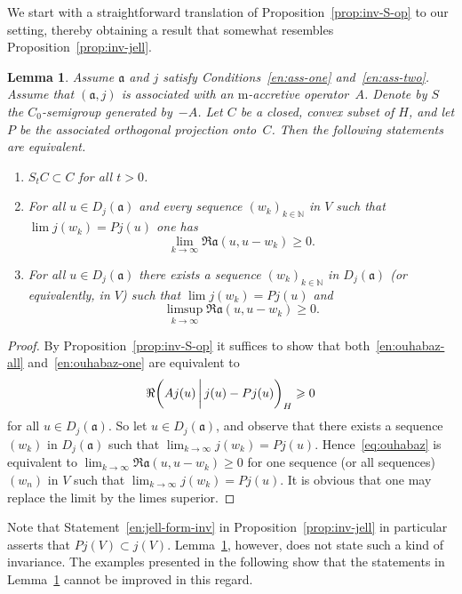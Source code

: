 \documentclass[a4paper,oneside,12pt]{amsart}
\theoremstyle{plain}
\newtheorem{lemma}[theorem]{Lemma}
\theoremstyle{definition}
\let\ge=\geqslant
\begin{document}
We start with a straightforward translation of Proposition~\ref{prop:inv-S-op} to our setting,
thereby obtaining a result that somewhat resembles Proposition~\ref{prop:inv-jell}.
\begin{lemma}\label{lem:acc-bad-ouhabaz}
Assume ${{\mathfrak{{a}}}}$ and $j$ satisfy Conditions~\ref{en:ass-one} and~\ref{en:ass-two}. Assume that
$({{\mathfrak{{a}}}},j)$ is associated with an {\ensuremath{\text{m}}}-accretive operator~$A$.
Denote by $S$ the $C_0$-semigroup generated by~$-A$. Let $C$ be a closed, convex subset of $H$,
and let $P$ be the associated orthogonal projection onto~$C$. Then the following statements are equivalent.

\begin{enumerate}[\upshape (i)]
\item $S_tC\subset C$ for all $t>0$.
\item\label{en:ouhabaz-all} For all $u\in D_j({{\mathfrak{{a}}}})$ and every sequence $(w_k)_{k\in{\mathbb{N}}}$ in $V$ such that $\lim j(w_k)=P j(u)$ one has
\[
    \lim_{k\to\infty}\Re{{\mathfrak{{a}}}}(u,u-w_k)\ge 0.
\]
\item\label{en:ouhabaz-one} For all $u\in D_j({{\mathfrak{{a}}}})$ there exists a sequence $(w_k)_{k\in{\mathbb{N}}}$ in $D_j({{\mathfrak{{a}}}})$ (or equivalently, in $V$) such that $\lim j(w_k)=P j(u)$ and
\[
    \limsup_{k\to\infty} \Re{{\mathfrak{{a}}}}(u,u-w_k)\ge 0.
\]
\end{enumerate}
\end{lemma}
\begin{proof}
By Proposition~\ref{prop:inv-S-op} it suffices to show that both~\ref{en:ouhabaz-all} and~\ref{en:ouhabaz-one} are equivalent to 
\begin{equation}\label{eq:ouhabaz}
   \Re{{\ifthenelse{\equal{auto}{auto}}{\left({Aj(u)}\mkern3mu{\biggm|}\mkern3mu {j(u)-Pj(u)}\right)}{}
\ifthenelse{\equal{auto}{b}}{\bigl({Aj(u)}\mkern3mu{\biggm|}\mkern3mu {j(u)-Pj(u)}\bigr)}{}
\ifthenelse{\equal{auto}{B}}{\Bigl({Aj(u)}\mkern3mu{\bigm|}\mkern3mu {j(u)-Pj(u)}\Bigr)}{}
}}_H\ge 0
\end{equation}
for all $u\in D_j({{\mathfrak{{a}}}})$.
So let $u\in D_j({{\mathfrak{{a}}}})$, and observe that there exists a sequence $(w_k)$ in $D_j({{\mathfrak{{a}}}})$ such
that $\lim_{k\to\infty}j(w_k)=Pj(u)$.
Hence~\eqref{eq:ouhabaz} is equivalent to $\lim_{k\to\infty}\Re{{\mathfrak{{a}}}}(u,u-w_k)\ge 0$
for one sequence (or all sequences) $(w_n)$ in $V$ such that $\lim_{k\to\infty}j(w_k)=Pj(u)$.
It is obvious that one may replace the limit by the limes superior.
\end{proof}
Note that Statement~\ref{en:jell-form-inv} in Proposition~\ref{prop:inv-jell} in particular asserts that $Pj(V)\subset j(V)$.
Lemma~\ref{lem:acc-bad-ouhabaz}, however, does not state such a kind of invariance.
The examples presented in the following show that the statements in Lemma~\ref{lem:acc-bad-ouhabaz} cannot be improved in this regard.
\end{document}
